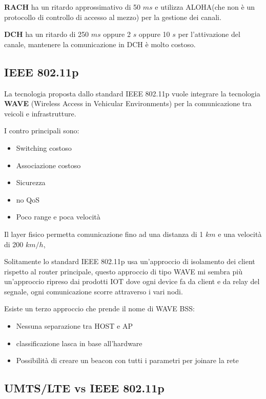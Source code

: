 \textbf{RACH} ha un ritardo approssimativo di 50 $ms$ e utilizza ALOHA(che non è un protocollo di
controllo di accesso al mezzo) per la gestione dei canali.

\textbf{DCH} ha un ritardo di 250 $ms$ oppure 2 $s$ oppure 10 $s$ per l'attivazione del canale,
mantenere la comunicazione in DCH \`e molto costoso.



\subsection{IEEE 802.11p}

La tecnologia proposta dallo standard IEEE 802.11p vuole integrare la tecnologia \textbf{WAVE}
(Wireless Access in Vehicular Environments) per la comunicazione tra veicoli e infrastrutture.

I contro principali sono:
\begin{itemize}
	\item Switching costoso
	\item Associazione costoso
	\item Sicurezza
	\item no QoS
	\item Poco range e poca velocità
\end{itemize}

Il layer fisico permetta comunicazione fino ad una distanza di 1 $km$ e una velocità di 200 $km/h$,

Solitamente lo standard IEEE 802.11p usa un'approccio di isolamento dei client rispetto al router
principale, questo approccio di tipo WAVE mi sembra pi\`u un'approccio ripreso dai prodotti IOT dove
ogni device fa da client e da relay del segnale, ogni comunicazione scorre attraverso i vari nodi.


Esiste un terzo approccio che prende il nome di WAVE BSS:
\begin{itemize}
	\item Nessuna separazione tra HOST e AP
	\item classificazione lasca in base all'hardware
	\item Possibilità di creare un beacon con tutti i parametri per joinare la rete
\end{itemize}


\subsection{UMTS/LTE vs IEEE 802.11p}

